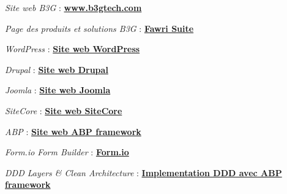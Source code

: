 \documentclass[12pt,a4paper,oneside]{book}
\begin{document}











%




\appendix



% 

\begin{thebibliography}{99}


    \emph{Site web B3G} :
    \href{https://b3gtech.com/}{\textbf{www.b3gtech.com}}

    \emph{Page des produits et solutions B3G} :
    \href{https://b3gtech.com/fawri-suite/}{\textbf{Fawri Suite}}


    \emph{WordPress} :
    \href{https://wordpress.com/fr/}{\textbf{Site web WordPress}}

    \emph{Drupal} :
    \href{https://www.drupal.org/}{\textbf{Site web Drupal}}

    \emph{Joomla} :
    \href{https://www.joomla.fr/}{\textbf{Site web Joomla}}

    \emph{SiteCore} :
    \href{https://www.sitecore.com/}{\textbf{Site web SiteCore}}

    \emph{ABP} :
    \href{https://abp.io/}{\textbf{Site web ABP framework}}

    \emph{Form.io Form Builder} :
    \href{https://form.io/}{\textbf{Form.io}}

    \emph{DDD Layers \& Clean Architecture} :
    \href{https://docs.abp.io/en/abp/4.2/Domain-Driven-Design-Implementation-Guide}{\textbf{Implementation DDD avec ABP framework}}



\end{thebibliography}
\end{document}
